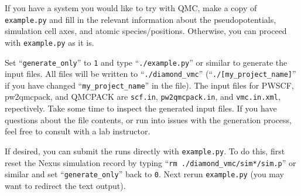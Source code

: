 If you have a system you would like to try with QMC, make a copy of \texttt{example.py} and fill in the relevant information about the pseudopotentials, simulation cell axes, and atomic species/positions.  Otherwise, you can proceed with \texttt{example.py} as it is.


%

Set ``\texttt{generate\_only}'' to \texttt{1} and type ``\texttt{./example.py}'' or similar to generate the input files.  All files will be written to ``\texttt{./diamond\_vmc}'' (``\texttt{./[my\_project\_name]}'' if you have changed ``\texttt{my\_project\_name}'' in the file).  The input files for PWSCF, pw2qmcpack, and QMCPACK are \texttt{scf.in}, \texttt{pw2qmcpack.in}, and \texttt{vmc.in.xml}, repectively.  Take some time to inspect the generated input files.  If you have questions about the file contents, or run into issues with the generation process, feel free to consult with a lab instructor.  

If desired, you can submit the runs directly with \texttt{example.py}.  To do this, first reset the Nexus simulation record by typing ``\texttt{rm ./diamond\_vmc/sim*/sim.p}'' or similar and set ``\texttt{generate\_only}'' back to \texttt{0}.  Next rerun \texttt{example.py}  (you may want to redirect the text output).  

